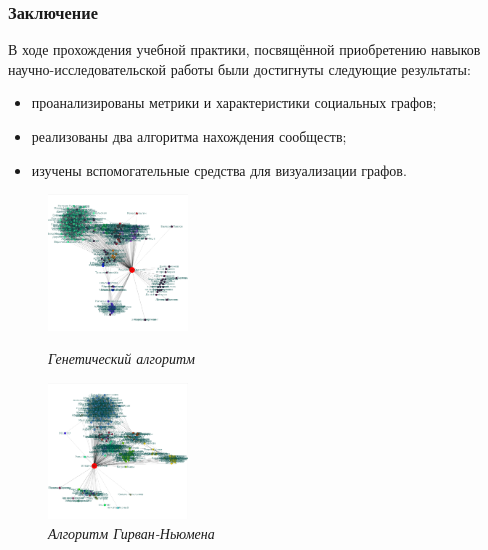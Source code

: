 \documentclass{spbseu}
\begin{document}
    \begin{frame}
		\frametitle{Заключение}
        \tableofcontents[part=6, pausesections]
        В ходе прохождения учебной практики, посвящённой приобретению навыков научно-исследовательской работы были достигнуты следующие результаты:
        \begin{itemize}
            \item проанализированы метрики и характеристики социальных графов;
            \item реализованы два алгоритма нахождения сообществ;
            \item изучены вспомогательные средства для визуализации графов.
        \end{itemize}
        \begin{figure}[ht]
        \begin{minipage}[b]{0.45\linewidth}
            \centering
            \includegraphics[width=140px]{images/ga_results2}
            \caption*{\textit{Генетический алгоритм}}
        \end{minipage}
        \hspace{0.5cm}
        \begin{minipage}[b]{0.45\linewidth}
            \centering
            \includegraphics[width=140px]{images/gn_results2}
            \caption*{\textit{Алгоритм Гирван-Ньюмена}}
        \end{minipage}
    \end{figure}
    \end{frame}
\end{document}
